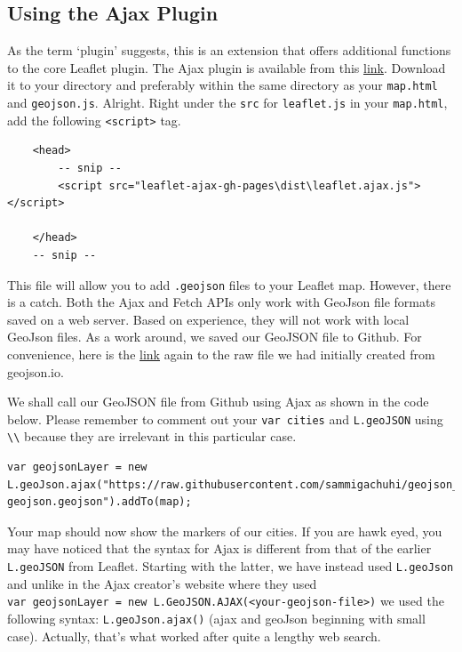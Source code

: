 \documentclass[
]{book}
\begin{document}
\hypertarget{using-the-ajax-plugin}{%
\subsection{Using the Ajax Plugin}\label{using-the-ajax-plugin}}

As the term `plugin' suggests, this is an extension that offers additional functions to the core Leaflet plugin. The Ajax plugin is available from this \href{https://github.com/calvinmetcalf/leaflet-ajax/archive/refs/heads/gh-pages.zip}{link}. Download it to your directory and preferably within the same directory as your \texttt{map.html} and \texttt{geojson.js}. Alright. Right under the \texttt{src} for \texttt{leaflet.js} in your \texttt{map.html}, add the following \texttt{\textless{}script\textgreater{}} tag.

\begin{verbatim}
    <head>
        -- snip --
        <script src="leaflet-ajax-gh-pages\dist\leaflet.ajax.js"></script>
        
    </head>
    -- snip --
\end{verbatim}

This file will allow you to add \texttt{.geojson} files to your Leaflet map. However, there is a catch. Both the Ajax and Fetch APIs only work with GeoJson file formats saved on a web server. Based on experience, they will not work with local GeoJson files. As a work around, we saved our GeoJSON file to Github. For convenience, here is the \href{https://raw.githubusercontent.com/sammigachuhi/geojson_files/main/cities-geojson.geojson}{link} again to the raw file we had initially created from geojson.io.

We shall call our GeoJSON file from Github using Ajax as shown in the code below. Please remember to comment out your \texttt{var\ cities} and \texttt{L.geoJSON} using \texttt{\textbackslash{}\textbackslash{}} because they are irrelevant in this particular case.

\begin{verbatim}
var geojsonLayer = new L.geoJson.ajax("https://raw.githubusercontent.com/sammigachuhi/geojson_files/main/cities-geojson.geojson").addTo(map);
\end{verbatim}

Your map should now show the markers of our cities. If you are hawk eyed, you may have noticed that the syntax for Ajax is different from that of the earlier \texttt{L.geoJSON} from Leaflet. Starting with the latter, we have instead used \texttt{L.geoJson} and unlike in the Ajax creator's website where they used \texttt{var\ geojsonLayer\ =\ new\ L.GeoJSON.AJAX(\textless{}your-geojson-file\textgreater{})} we used the following syntax: \texttt{L.geoJson.ajax()} (ajax and geoJson beginning with small case). Actually, that's what worked after quite a lengthy web search.
\end{document}
